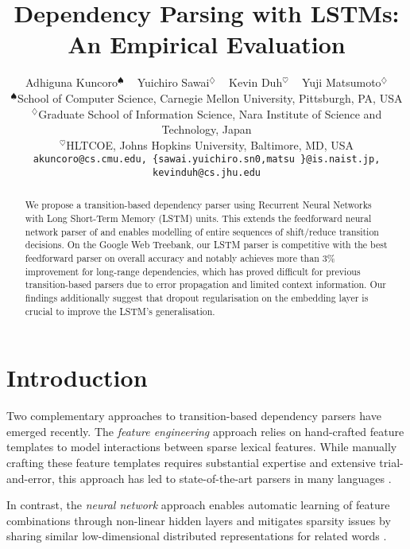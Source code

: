 \documentclass[11pt,a4paper]{article}
\title{Dependency Parsing with LSTMs: An Empirical Evaluation}
\author{Adhiguna Kuncoro$^{\spadesuit}$ ~ Yuichiro Sawai$^{\diamondsuit}$ ~ Kevin Duh$^{\heartsuit}$ ~ Yuji Matsumoto$^{\diamondsuit}$\\
$^{\spadesuit}$School of Computer Science, Carnegie Mellon University, Pittsburgh, PA, USA \\
$^{\diamondsuit}$Graduate School of Information Science, Nara Institute of Science and Technology, Japan \\
$^{\heartsuit}$HLTCOE, Johns Hopkins University, Baltimore, MD, USA\\
{\small \tt akuncoro@cs.cmu.edu, \{sawai.yuichiro.sn0,matsu  \}@is.naist.jp, kevinduh@cs.jhu.edu}
}
\date{}
\begin{document}
\maketitle
\begin{abstract}
We propose a transition-based dependency parser using Recurrent Neural Networks with Long Short-Term Memory (LSTM) units. This extends the feedforward neural network parser of  and enables modelling of entire sequences of shift/reduce transition decisions. On the Google Web Treebank, our LSTM parser is competitive with the best feedforward parser on overall accuracy and notably achieves more than 3\% improvement for long-range dependencies, which has proved difficult for previous transition-based parsers due to error propagation and limited context information. Our findings additionally suggest that dropout regularisation on the embedding layer is crucial to improve the LSTM's generalisation.


\end{abstract}

\section{Introduction}

Two complementary approaches to transition-based dependency parsers have emerged recently. 
The {\em feature engineering} approach relies on hand-crafted feature templates to model interactions between sparse lexical features. While manually crafting these feature templates requires substantial expertise and extensive trial-and-error, this approach has led to state-of-the-art parsers in many languages \cite{BM06,ZN11}.

In contrast, the {\em neural network} approach enables automatic learning of feature combinations through  non-linear hidden layers and mitigates sparsity issues by sharing similar low-dimensional distributed  representations for related words \cite{Bet03}.
\end{document}
